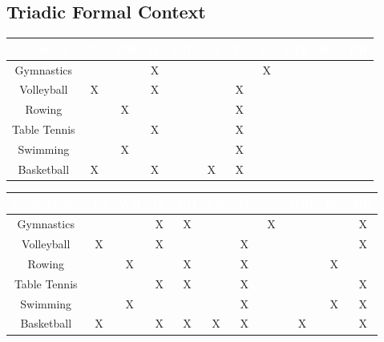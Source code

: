 \documentclass{article}
\begin{document}
\subsection*{Triadic Formal Context}
\begin{table}[h]
\centering
\begin{tabular}{|c|c|c|c|c|c|c|c|c|c|c|}
\hline
\rowcolor{blue!70} \textcolor{white}{\textbf{Amateur}} & \textcolor{white}{\textbf{TS}} & \textcolor{white}{\textbf{WB}} & \textcolor{white}{\textbf{IV}} & \textcolor{white}{\textbf{EH}} & \textcolor{white}{\textbf{CS}} & \textcolor{white}{\textbf{TE}} & \textcolor{white}{\textbf{SS}} & \textcolor{white}{\textbf{HIR}} & \textcolor{white}{\textbf{RS}} & \textcolor{white}{\textbf{PR}} \\
\hline
\rowcolor{blue!30} Gymnastics & & & X & & & & X & & & \\
\hline
\rowcolor{blue!30} Volleyball & X & & X & & & X & & & & \\
\hline
\rowcolor{blue!30} Rowing & & X & & & & X & & & & \\
\hline
\rowcolor{blue!30} Table Tennis & & & X & & & X & & & & \\
\hline
\rowcolor{blue!30} Swimming & & X & & & & X & & & & \\
\hline
\rowcolor{blue!30} Basketball & X & & X & & X & X & & & & \\
\hline
\end{tabular}
\vspace{0.5cm}
\begin{tabular}{|c|c|c|c|c|c|c|c|c|c|c|}
\hline
\rowcolor{blue!70} \textcolor{white}{\textbf{Professional}} & \textcolor{white}{\textbf{TS}} & \textcolor{white}{\textbf{WB}} & \textcolor{white}{\textbf{IV}} & \textcolor{white}{\textbf{EH}} & \textcolor{white}{\textbf{CS}} & \textcolor{white}{\textbf{TE}} & \textcolor{white}{\textbf{SS}} & \textcolor{white}{\textbf{HIR}} & \textcolor{white}{\textbf{RS}} & \textcolor{white}{\textbf{PR}} \\
\hline
\rowcolor{blue!30} Gymnastics & & & X & X & & & X & & & X \\
\hline
\rowcolor{blue!30} Volleyball & X & & X & & & X & & & & X \\
\hline
\rowcolor{blue!30} Rowing & & X & & X & & X & & & X & \\
\hline
\rowcolor{blue!30} Table Tennis & & & X & X & & X & & & & X \\
\hline
\rowcolor{blue!30} Swimming & & X & & & & X & & & X & X \\
\hline
\rowcolor{blue!30} Basketball & X & & X & X & X & X & & X & & X \\

\end{tabular}
\end{table}
\end{document}
